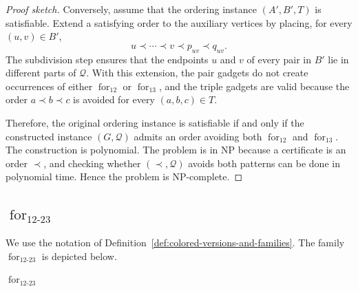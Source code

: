 \documentclass[12pt]{article}
\theoremstyle{plain}
\theoremstyle{definition}
\theoremstyle{remark}
\theoremstyle{definition}
\newcommand{\forlabel}{\mathrm{for}}
\DeclareRobustCommand{\forparam}[1]{%
  \ensuremath{\mathop{\forlabel}\nolimits_{#1}}%
}
\newcommand{\forrs}{\forparam{12}}
\newcommand{\forrt}{\forparam{13}}
\begin{document}
\begin{proof}[Proof sketch]
Conversely, assume that the ordering instance \((A',B',T)\) is satisfiable. Extend a satisfying order to the auxiliary
vertices by placing, for every \((u,v)\in B'\),
\[
u\prec \cdots \prec v \prec p_{uv}\prec q_{uv}.
\]
The subdivision step ensures that the endpoints \(u\) and \(v\) of every pair in \(B'\) lie in different parts of
\(\mathcal Q\). With this extension, the pair gadgets do not create occurrences of either \(\forrs\) or \(\forrt\),
and the triple gadgets are valid because the order \(a\prec b\prec c\) is avoided for every \((a,b,c)\in T\).

Therefore, the original ordering instance is satisfiable if and only if the constructed instance \((G,\mathcal Q)\)
admits an order avoiding both \(\forrs\) and \(\forrt\). The construction is polynomial. The problem is in NP because
a certificate is an order \(\prec\), and checking whether \((\prec,\mathcal Q)\) avoids both patterns can be done in
polynomial time. Hence the problem is NP-complete.
\end{proof}







\subsection{
\texorpdfstring{\(\forparam{12\text{-}23}\)}
{for12-23}
}
\label{subsec:for12-23}

We use the notation of
Definition~\ref{def:colored-versions-and-families}.
The family \(\forparam{12\text{-}23}\) is depicted below.

\begin{center}

\smallskip
\(\forparam{12\text{-}23}\)
\end{center}
\end{document}
